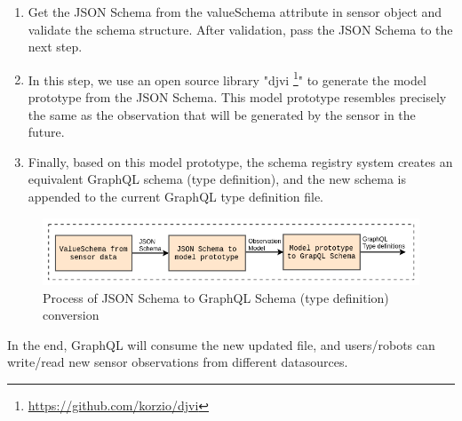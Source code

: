 	\begin{enumerate}
		\item Get the JSON Schema from the valueSchema attribute in sensor object and validate the schema structure. After validation, pass the JSON Schema to the next step.
		\item In this step, we use an open source library  "djvi \footnote{ \url{https://github.com/korzio/djvi}}" to generate the model prototype from the JSON Schema. This model prototype resembles precisely the same as the observation that will be generated by the sensor in the future.
		\item Finally, based on this model prototype, the schema registry system creates an equivalent GraphQL schema (type definition), and the new schema is appended to the current GraphQL type definition file.
	\end{enumerate}
	
	\begin{figure}[!htbp] 
		\begin{center}
			\includegraphics[scale=0.5]{./images/png/implementation/jsonscema_to_graphql}	
			\caption{Process of JSON Schema to GraphQL Schema (type definition) conversion}	
			\label{fig:jsonscema_to_graphql}	
		\end{center}
	\end{figure}

	In the end, GraphQL will consume the new updated file, and users/robots can write/read new sensor observations from different datasources.
	
